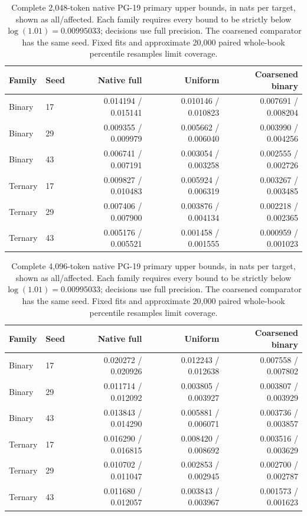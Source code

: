 \begin{table}[htbp]
\centering\small
\begin{tabular}{llrrr}
\toprule
Family & Seed & Native full & Uniform & Coarsened binary \\
\midrule
Binary & 17 & 0.014194 / 0.015141 & 0.010146 / 0.010823 & 0.007691 / 0.008204 \\
Binary & 29 & 0.009355 / 0.009979 & 0.005662 / 0.006040 & 0.003990 / 0.004256 \\
Binary & 43 & 0.006741 / 0.007191 & 0.003054 / 0.003258 & 0.002555 / 0.002726 \\
Ternary & 17 & 0.009827 / 0.010483 & 0.005924 / 0.006319 & 0.003267 / 0.003485 \\
Ternary & 29 & 0.007406 / 0.007900 & 0.003876 / 0.004134 & 0.002218 / 0.002365 \\
Ternary & 43 & 0.005176 / 0.005521 & 0.001458 / 0.001555 & 0.000959 / 0.001023 \\
\bottomrule
\end{tabular}
\caption{Complete 2,048-token native PG-19 primary upper bounds,
in nats per target, shown as all/affected. Each family requires every bound
to be strictly below \(\log(1.01)=0.00995033\); decisions use full precision.
The coarsened comparator has the same seed. Fixed fits and approximate
20,000 paired whole-book percentile resamples limit coverage.}
\label{tab:native-pg19-2048}
\end{table}

\begin{table}[htbp]
\centering\small
\begin{tabular}{llrrr}
\toprule
Family & Seed & Native full & Uniform & Coarsened binary \\
\midrule
Binary & 17 & 0.020272 / 0.020926 & 0.012243 / 0.012638 & 0.007558 / 0.007802 \\
Binary & 29 & 0.011714 / 0.012092 & 0.003805 / 0.003927 & 0.003807 / 0.003929 \\
Binary & 43 & 0.013843 / 0.014290 & 0.005881 / 0.006071 & 0.003736 / 0.003857 \\
Ternary & 17 & 0.016290 / 0.016815 & 0.008420 / 0.008692 & 0.003516 / 0.003629 \\
Ternary & 29 & 0.010702 / 0.011047 & 0.002853 / 0.002945 & 0.002700 / 0.002787 \\
Ternary & 43 & 0.011680 / 0.012057 & 0.003843 / 0.003967 & 0.001573 / 0.001623 \\
\bottomrule
\end{tabular}
\caption{Complete 4,096-token native PG-19 primary upper bounds,
in nats per target, shown as all/affected. Each family requires every bound
to be strictly below \(\log(1.01)=0.00995033\); decisions use full precision.
The coarsened comparator has the same seed. Fixed fits and approximate
20,000 paired whole-book percentile resamples limit coverage.}
\label{tab:native-pg19-4096}
\end{table}

